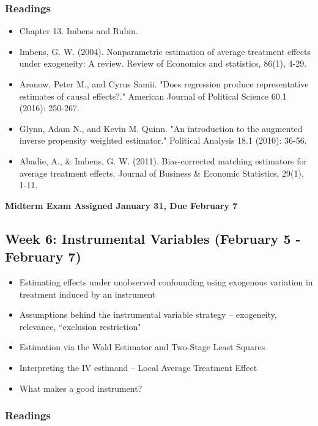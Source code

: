 \documentclass[11pt, article, oneside]{memoir}
\theoremstyle{Assumption}
\begin{document}
\subsubsection*{Readings}

\begin{itemize}
\item Chapter 13. Imbens and Rubin. 
\item Imbens, G. W. (2004). Nonparametric estimation of average treatment effects under exogeneity: A review. Review of Economics and statistics, 86(1), 4-29.
\item Aronow, Peter M., and Cyrus Samii. "Does regression produce representative estimates of causal effects?." American Journal of Political Science 60.1 (2016): 250-267.
\item Glynn, Adam N., and Kevin M. Quinn. "An introduction to the augmented inverse propensity weighted estimator." Political Analysis 18.1 (2010): 36-56.
\item Abadie, A., \& Imbens, G. W. (2011). Bias-corrected matching estimators for average treatment effects. Journal of Business \& Economic Statistics, 29(1), 1-11.
\end{itemize}


\textbf{Midterm Exam Assigned January 31, Due February 7}

\subsection{Week 6: Instrumental Variables (February 5 - February 7)}

\begin{itemize}
\item Estimating effects under unobserved confounding using exogenous variation in treatment induced by an instrument
\item Assumptions behind the instrumental variable strategy -- exogeneity, relevance, ``exclusion restriction"
\item Estimation via the Wald Estimator and Two-Stage Least Squares
\item Interpreting the IV estimand -- Local Average Treatment Effect 
\item What makes a good instrument?
\end{itemize}


\subsubsection*{Readings}
\end{document}

